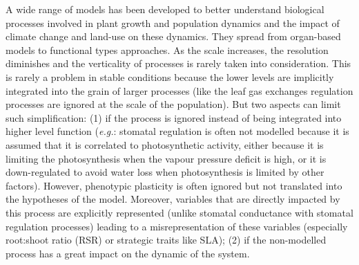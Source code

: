 A wide range of models has been developed to better understand biological processes involved in plant growth and population dynamics and the impact of climate change and land-use on these dynamics. They spread from organ-based models to functional types approaches. As the scale increases, the resolution diminishes and the verticality of processes is rarely taken into consideration. This is rarely a problem in stable conditions because the lower levels are implicitly integrated into the grain of larger processes (like the leaf gas exchanges regulation processes are ignored at the scale of the population). But two aspects can limit such simplification: (1) if the process is ignored instead of being integrated into higher level function (\textit{e.g.}: stomatal regulation is often not modelled because it is assumed that it is correlated to photosynthetic activity, either because it is limiting the photosynthesis when the vapour pressure deficit is high, or it is down-regulated to avoid water loss when photosynthesis is limited by other factors). However, phenotypic plasticity is often ignored but not translated into the hypotheses of the model. Moreover, variables that are directly impacted by this process are explicitly represented (unlike stomatal conductance with stomatal regulation processes) leading to a misrepresentation of these variables (especially root:shoot ratio (RSR) or strategic traits like SLA); (2) if the non-modelled process has a great impact on the dynamic of the system. 


